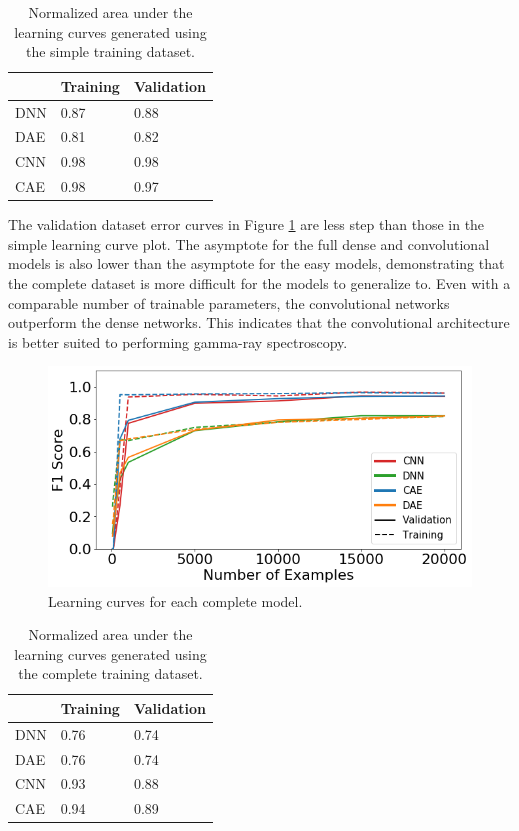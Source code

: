 \begin{table}[H]
	\centering
	\caption{Normalized area under the learning curves generated using the simple training dataset.}
	\label{table:complete_learning_curve_auc}
	\begin{tabular}{lll}
		\hline
		& \textbf{Training} & \textbf{Validation} \\ \hline
		DNN & 0.87 & 0.88 \\
		DAE & 0.81 & 0.82 \\
		CNN & 0.98 & 0.98 \\
		CAE & 0.98 & 0.97 \\ \hline
	\end{tabular}
\end{table}

The validation dataset error curves in Figure \ref{fig:learning_curves_full} are less step than those in the simple learning curve plot. The asymptote for the full dense and convolutional models is also lower than the asymptote for the easy models, demonstrating that the complete dataset is more difficult for the models to generalize to. Even with a comparable number of trainable parameters, the convolutional networks outperform the dense networks. This indicates that the convolutional architecture is better suited to performing gamma-ray spectroscopy. 

\begin{figure}[H]
	\centering
	\includegraphics[width=0.9\linewidth]{images/learning_curves_full}
	\caption{Learning curves for each complete model.}
	\label{fig:learning_curves_full}
\end{figure}

\begin{table}[H]
	\centering
	\caption{Normalized area under the learning curves generated using the complete training dataset.}
	\label{table:complete_learning_curve_auc}
	\begin{tabular}{lll}
		\hline
		& \textbf{Training} & \textbf{Validation} \\ \hline
		DNN & 0.76 & 0.74 \\
		DAE & 0.76 & 0.74 \\
		CNN & 0.93 & 0.88 \\
		CAE & 0.94 & 0.89 \\ \hline
	\end{tabular}
\end{table}

